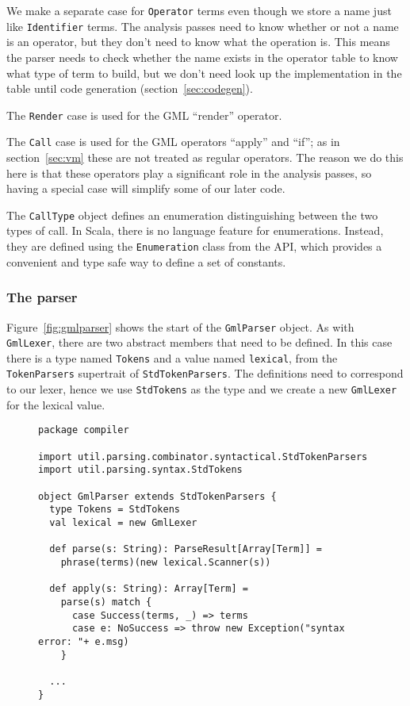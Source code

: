 We make a separate case for \verb!Operator! terms
even though we store a name just like \verb!Identifier! terms.
The analysis passes need to know whether or not a name is an operator,
but they don't need to know what the operation is.
This means the parser needs to check whether the name
exists in the operator table to know what type of term to build,
but we don't need look up the implementation in the table until
code generation (section~\ref{sec:codegen}).

The \verb!Render! case is used for the GML ``render'' operator.

The \verb!Call! case is used for the GML operators ``apply'' and ``if'';
as in section~\ref{sec:vm} these are not treated as regular operators.
The reason we do this here is that these operators
play a significant role in the analysis passes,
so having a special case will simplify some of our later code.

The \verb!CallType! object defines an enumeration
distinguishing between the two types of call.
In Scala, there is no language feature for enumerations.
Instead, they are defined using
the \verb!Enumeration! class from the API,
which provides a convenient and type safe way to define a set of constants.


\subsubsection{The parser\label{sec:parser}}

Figure~\ref{fig:gmlparser} shows the start of the \verb!GmlParser! object.
As with \verb!GmlLexer!,
there are two abstract members that need to be defined.
In this case there is a type named \verb!Tokens!
and a value named \verb!lexical!,
from the \verb!TokenParsers! supertrait of \verb!StdTokenParsers!.
The definitions need to correspond to our lexer,
hence we use \verb!StdTokens! as the type
and we create a new \verb!GmlLexer! for the lexical value.

\begin{figure}
\begin{verbatim}
package compiler

import util.parsing.combinator.syntactical.StdTokenParsers
import util.parsing.syntax.StdTokens

object GmlParser extends StdTokenParsers {
  type Tokens = StdTokens
  val lexical = new GmlLexer

  def parse(s: String): ParseResult[Array[Term]] =
    phrase(terms)(new lexical.Scanner(s))

  def apply(s: String): Array[Term] =
    parse(s) match {
      case Success(terms, _) => terms
      case e: NoSuccess => throw new Exception("syntax error: "+ e.msg)
    }

  ...
}
\end{verbatim}
\getcaption
\end{figure}

